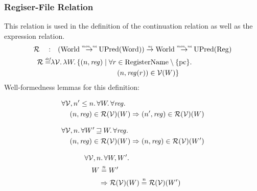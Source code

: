\documentclass{article}
\newcommand{\monnefun}{\stackrel{\textit{\tiny{mon, ne}}}{\rightarrow}}
\newcommand{\nefun}{\stackrel{\textit{\tiny{ne}}}{\rightarrow}}
\newcommand{\defeq}{\stackrel{\textit{\tiny{def}}}{=}}
\newcommand{\nequal}[1][n]{\stackrel{\tiny{#1}}{=}}
\newcommand{\var}[1]{\mathit{#1}}
\newcommand{\pcreg}{\mathrm{pc}}
\newcommand{\reg}{\var{reg}}
\newcommand{\future}{\mathbin{\sqsupseteq}}
\newcommand{\asmType}{\plaindom{AsmType}}
\newcommand{\plaindom}[1]{\mathrm{#1}}
\newcommand{\Words}{\plaindom{Word}}
\newcommand{\RegName}{\plaindom{RegisterName}}
\newcommand{\Regs}{\plaindom{Reg}}
\newcommand{\Worlds}{\plaindom{World}}
\newcommand{\UPred}[1]{\plaindom{UPred}(#1)}
\newcommand{\intr}[2]{\mathcal{#1}}
\newcommand{\valueintr}[1]{\intr{V}{#1}}
\newcommand{\regintr}[1]{\intr{R}{#1}}
\newcommand{\stdvr}{\valueintr{\asmType}}
\newcommand{\stdrr}{\regintr{\asmType}}
\newcommand{\npair}[2][n]{\left(#1,#2 \right)}
\begin{document}
\subsubsection{Regiser-File Relation}
\label{subsubsec:register-file-relation}
This relation is used in the definition of the continuation relation as well as the expression relation.
\begin{align*}
  \stdrr \quad : & \quad (\Worlds \monnefun \UPred{\Words}) \nefun \Worlds \monnefun \UPred{\Regs} \\
  \stdrr \defeq & \lambda \stdvr \ldotp \lambda W \ldotp
                     \begin{aligned}[t]
                       \{ \npair{\reg} \mid & \;\forall r \in \RegName \setminus \{\pcreg\} \ldotp \\
                                            & \;\quad  \npair{\reg(r)} \in \stdvr(W) \}
                     \end{aligned}
\end{align*}
Well-formedness lemmas for this definition:
\begin{lemma}
\label{lem:reg-dc}
  \begin{align*}
    &\forall \stdvr, n' \leq n \ldotp \forall W \ldotp \forall \reg \ldotp\\
    &\quad \npair{\reg} \in \stdrr(\stdvr)(W) \Rightarrow \npair[n']{\reg} \in \stdrr(\stdvr)(W)
  \end{align*}
\end{lemma}

\begin{lemma}
\label{lem:reg-mono-worlds}
  \begin{align*}
    &\forall \stdvr, n \ldotp \forall W' \future W \ldotp \forall \reg \ldotp\\
    &\quad \npair{\reg} \in \stdrr(\stdvr)(W) \Rightarrow \npair{\reg} \in \stdrr(\stdvr)(W')
  \end{align*}
\end{lemma}

\begin{lemma}
  \label{lem:reg-ne-worlds}
  \begin{align*}
    &\forall \stdvr, n \ldotp \forall W, W' \ldotp \\
    &\quad W \nequal W' \\
    &\qquad \Rightarrow \stdrr(\stdvr)(W) \nequal \stdrr(\stdvr)(W')
  \end{align*}
\end{lemma}
\end{document}
